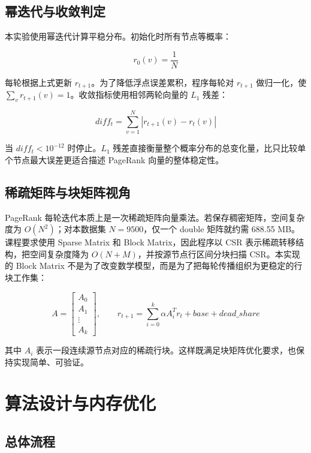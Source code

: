 \documentclass[UTF8,a4paper,10pt]{ctexart}
\newcommand{\xiaosi}{\fontsize{12pt}{20pt}\selectfont}
\begin{document}
\subsection{幂迭代与收敛判定}

本实验使用幂迭代计算平稳分布。初始化时所有节点等概率：

\begin{equation}
r_0(v)=\frac{1}{N}
\end{equation}

每轮根据上式更新 $r_{t+1}$。为了降低浮点误差累积，程序每轮对 $r_{t+1}$ 做归一化，使 $\sum_v r_{t+1}(v)=1$。收敛指标使用相邻两轮向量的 $L_1$ 残差：

\begin{equation}
diff_t=\sum_{v=1}^{N}|r_{t+1}(v)-r_t(v)|
\end{equation}

当 $diff_t<10^{-12}$ 时停止。$L_1$ 残差直接衡量整个概率分布的总变化量，比只比较单个节点最大误差更适合描述 PageRank 向量的整体稳定性。

\subsection{稀疏矩阵与块矩阵视角}

PageRank 每轮迭代本质上是一次稀疏矩阵向量乘法。若保存稠密矩阵，空间复杂度为 $O(N^2)$；对本数据集 $N=9500$，仅一个 double 矩阵就约需 688.55 MB。课程要求使用 Sparse Matrix 和 Block Matrix，因此程序以 CSR 表示稀疏转移结构，把空间复杂度降为 $O(N+M)$，并按源节点行区间分块扫描 CSR。本实现的 Block Matrix 不是为了改变数学模型，而是为了把每轮传播组织为更稳定的行块工作集：

\begin{equation}
A=
\begin{bmatrix}
A_{0}\\
A_{1}\\
\vdots\\
A_{k}
\end{bmatrix},\qquad
r_{t+1}=\sum_{i=0}^{k}\alpha A_i^{T}r_t + base + dead\_share
\end{equation}

其中 $A_i$ 表示一段连续源节点对应的稀疏行块。这样既满足块矩阵优化要求，也保持实现简单、可验证。

\section{算法设计与内存优化}
\xiaosi

\subsection{总体流程}
\end{document}

